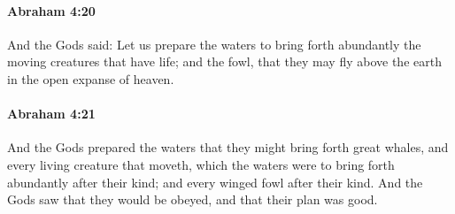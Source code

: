 
		\paragraph{Abraham 4:20} %
			\label{ABRAHAM-4-20}

			And the Gods said: Let us prepare the waters to bring forth abundantly the moving creatures that have life; and the fowl, that they may fly above the earth in the open expanse of heaven.


		\paragraph{Abraham 4:21} %
			\label{ABRAHAM-4-21}

			And the Gods prepared the waters that they might bring forth great whales, and every living creature that moveth, which the waters were to bring forth abundantly after their kind; and every winged fowl after their kind.  And the Gods saw that they would be obeyed, and that their plan was good.

